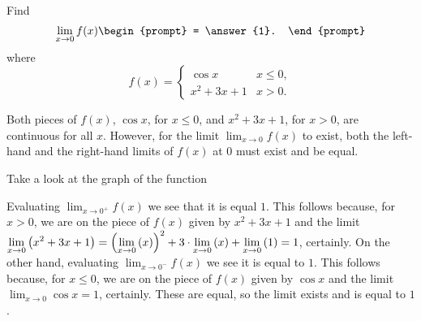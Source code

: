 \documentclass{ximera}
\author{Gregory Hartman \and Matthew Carr}
\begin{document}
\begin{exercise}



  Find 
  \[
  \lim_{x\to 0} f(x)
  \begin{prompt}
  = \answer{1}.
  \end{prompt}
  \]
  where
  \[
  f(x) = \left\{\begin{array}{cl} \cos x & x\leq 0, \\ x^2+3x+1 & x>0. \end{array}\right.
  \]
    \begin{hint}
     Both pieces of $f(x)$, $\cos x$, for $x\leq0$, and $x^2+3x+1$, for $x>0$, are continuous for all $x$. However, for the limit $\lim_{x\to0}f(x)$ to exist, both the left-hand and the right-hand limits of $f(x)$ at $0$ must exist and be equal.
    \end{hint}
     \begin{hint}
    	Take a look at the graph of the function
    \begin{center}
      \end{center} 
    \end{hint}
    \begin{hint}
     Evaluating $\lim_{x\to0^{+}}f(x)$ we see that it is equal $1$. This follows because, for $x>0$, we are on the piece of $f(x)$ given by $x^2+3x+1$ and the limit $\lim_{x\to0}\p{x^2+3x+1}=\p{\lim_{x\to0}\p{x}}^2+3\cdot\lim_{x\to0}\p{x}+\lim_{x\to0}\p{1}=1$, certainly. On the other hand, evaluating $\lim_{x\to0^{-}}f(x)$ we see it is equal to $1$. This follows because, for $x\leq0$, we are on the piece of $f(x)$ given by $\cos x$ and the limit $\lim_{x\to0}\cos x=1$, certainly. These are equal, so the limit exists and is equal to $1$.
    \end{hint}
\end{exercise}
\end{document}

